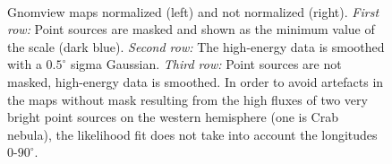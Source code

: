 \documentclass[a4paper]{article}
\begin{document}
\begin{figure}[h]
{\begin{subfigure}[b]{.5\textwidth}
	\end{subfigure}%
	}\\
\caption{Gnomview maps normalized (left) and not normalized (right). \textit{First row:} Point sources are masked and shown as the minimum value of the scale (dark blue). \textit{Second row:} The high-energy data is smoothed with a $0.5^\circ$ sigma Gaussian. \textit{Third row:} Point sources are not masked, high-energy data is smoothed. In order to avoid artefacts in the maps without mask resulting from the high fluxes of two very bright point sources on the western hemisphere (one is Crab nebula), the likelihood fit does not take into account the longitudes 0-$90^\circ$.}
\label{Fit_IC_pi0_to_ROI}
\end{figure}


\newpage
\begin{figure}[h]
\end{figure}
\end{document}
